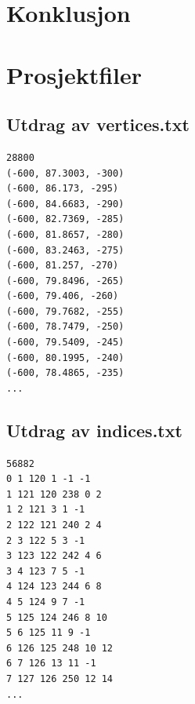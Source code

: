 \documentclass[norsk, doc, 11pt, a4paper]{apa7}  %
\begin{document}
\section{Konklusjon}

\printbibliography

\appendix
\section{Prosjektfiler}
\subsection{Utdrag av vertices.txt}
\begin{verbatim}
28800
(-600, 87.3003, -300)
(-600, 86.173, -295)
(-600, 84.6683, -290)
(-600, 82.7369, -285)
(-600, 81.8657, -280)
(-600, 83.2463, -275)
(-600, 81.257, -270)
(-600, 79.8496, -265)
(-600, 79.406, -260)
(-600, 79.7682, -255)
(-600, 78.7479, -250)
(-600, 79.5409, -245)
(-600, 80.1995, -240)
(-600, 78.4865, -235)
...
\end{verbatim}

\subsection{Utdrag av indices.txt}
\begin{verbatim}
56882
0 1 120 1 -1 -1
1 121 120 238 0 2
1 2 121 3 1 -1
2 122 121 240 2 4
2 3 122 5 3 -1
3 123 122 242 4 6
3 4 123 7 5 -1
4 124 123 244 6 8
4 5 124 9 7 -1
5 125 124 246 8 10
5 6 125 11 9 -1
6 126 125 248 10 12
6 7 126 13 11 -1
7 127 126 250 12 14
...
\end{verbatim}
\end{document}
